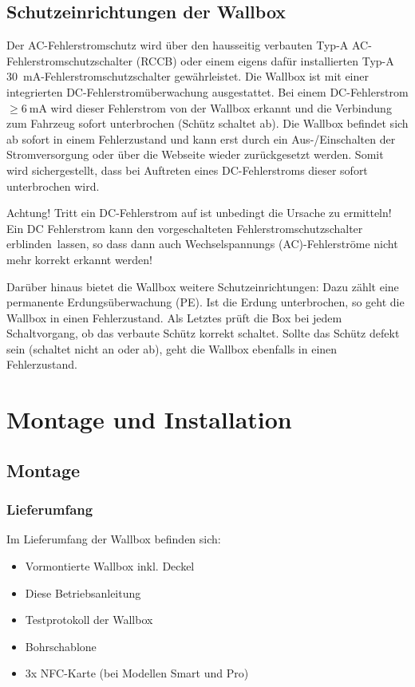 \documentclass[a4paper,10pt]{article}
\newcommand{\hint}[1]{\begin{tcolorbox}[colback=boxgray,colframe=black,coltext=
white,title=Hinweis]#1\end{tcolorbox}}
\begin{document}
\begin{multicols*}{2}
	\subsection{Schutzeinrichtungen der Wallbox}
	Der AC-Fehlerstromschutz wird über den hausseitig verbauten
	Typ-A AC-Fehlerstromschutzschalter (RCCB) oder einem eigens dafür installierten
	Typ-A \SI{30}{\milli\ampere}-Fehlerstromschutzschalter gewährleistet. Die Wallbox ist
	mit einer integrierten DC-Fehlerstromüberwachung ausgestattet. 
	Bei einem DC-Fehlerstrom $\geq \SI{6}{\milli\ampere}$ wird dieser
	Fehlerstrom von der Wallbox erkannt und die Verbindung zum Fahrzeug sofort
	unterbrochen (Schütz schaltet ab). Die Wallbox befindet sich ab sofort in einem
	Fehlerzustand und kann erst durch ein Aus-/Einschalten der
	Stromversorgung oder über die Webseite wieder zurückgesetzt werden. 
	Somit wird sichergestellt, dass bei Auftreten eines
	DC-Fehlerstroms dieser sofort unterbrochen wird.
	\hint{Achtung! Tritt ein DC-Fehlerstrom auf ist unbedingt die Ursache zu
	ermitteln! Ein DC Fehlerstrom kann den vorgeschalteten Fehlerstromschutzschalter
	\glqq erblinden\grqq~lassen, so dass dann auch Wechselspannungs
	(AC)-Fehlerströme nicht mehr korrekt erkannt werden!}

	Darüber hinaus bietet die Wallbox weitere Schutzeinrichtungen: Dazu zählt eine
	permanente Erdungsüberwachung (PE). Ist die Erdung unterbrochen, so geht die
	Wallbox in einen Fehlerzustand. Als Letztes prüft die Box bei jedem
	Schaltvorgang, ob das verbaute Schütz korrekt schaltet. Sollte das
	Schütz defekt sein (schaltet nicht an oder ab), geht die Wallbox
	ebenfalls in einen Fehlerzustand.

	\newpage
	\section{Montage und Installation}
	\subsection{Montage}
	\subsubsection{Lieferumfang}
	Im Lieferumfang der Wallbox befinden sich:
	\begin{itemize}
		\item Vormontierte Wallbox inkl. Deckel
		\item Diese Betriebsanleitung
		\item Testprotokoll der Wallbox
		\item Bohrschablone
		\item 3x NFC-Karte (bei Modellen Smart und Pro)
	\end{itemize}


\end{multicols*}
\end{document}
